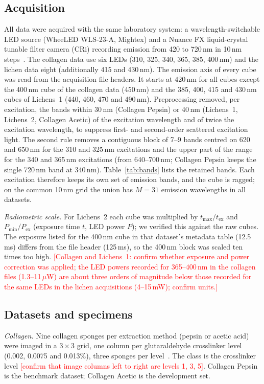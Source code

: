 \documentclass[journal]{IEEEtran}
\newcommand{\RESULT}[1]{\textcolor{red}{[#1]}}
\begin{document}
\subsection{Acquisition}\label{sec:acq}
All data were acquired with the same laboratory system: a wavelength-switchable LED source (WheeLED WLS-23-A, Mightex) and a Nuance FX liquid-crystal tunable filter camera (CRi) recording emission from 420 to 720\,nm in 10\,nm steps~\cite{zenodo_lichens,zenodo_collagen}. The collagen data use six LEDs (310, 325, 340, 365, 385, 400\,nm) and the lichen data eight (additionally 415 and 430\,nm). The emission axis of every cube was read from the acquisition file headers. It starts at 420\,nm for all cubes except the 400\,nm cube of the collagen data (450\,nm) and the 385, 400, 415 and 430\,nm cubes of Lichens~1 (440, 460, 470 and 490\,nm). Preprocessing removed, per excitation, the bands within 30\,nm (Collagen Pepsin) or 40\,nm (Lichens~1, Lichens~2, Collagen Acetic) of the excitation wavelength and of twice the excitation wavelength, to suppress first- and second-order scattered excitation light. The second rule removes a contiguous block of 7--9 bands centred on 620 and 650\,nm for the 310 and 325\,nm excitations and the upper part of the range for the 340 and 365\,nm excitations (from 640--700\,nm; Collagen Pepsin keeps the single 720\,nm band at 340\,nm). Table~\ref{tab:bands} lists the retained bands. Each excitation therefore keeps its own set of emission bands, and the cube is ragged; on the common 10\,nm grid the union has $M=31$ emission wavelengths in all datasets.

\emph{Radiometric scale.} For Lichens~2 each cube was multiplied by $t_{\max}/t_{\mathrm{ex}}$ and $P_{\min}/P_{\mathrm{ex}}$ (exposure time $t$, LED power $P$); we verified this against the raw cubes. The exposure listed for the 400\,nm cube in that dataset's metadata table (12.5\,ms) differs from the file header (125\,ms), so the 400\,nm block was scaled ten times too high. \RESULT{Collagen and Lichens~1: confirm whether exposure and power correction was applied; the LED powers recorded for 365--400\,nm in the collagen files (1.3--11\,$\mu$W) are about three orders of magnitude below those recorded for the same LEDs in the lichen acquisitions (4--15\,mW); confirm units.}

\subsection{Datasets and specimens}\label{sec:datasets}
\emph{Collagen.} Nine collagen sponges per extraction method (pepsin or acetic acid) were imaged in a $3\times3$ grid, one column per glutaraldehyde crosslinker level (0.002, 0.0075 and 0.013\%), three sponges per level~\cite{zenodo_collagen}. The class is the crosslinker level \RESULT{confirm that image columns left to right are levels 1, 3, 5}. Collagen Pepsin is the benchmark dataset; Collagen Acetic is the development set.
\end{document}
